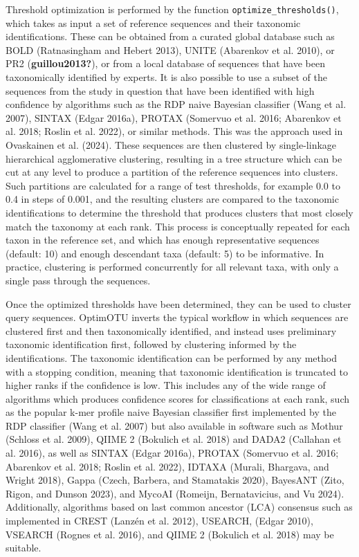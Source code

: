 \documentclass[
]{article}
\begin{document}
Threshold optimization is performed by the function \texttt{optimize\_thresholds()}, which takes as input a set of reference sequences and their taxonomic identifications.
These can be obtained from a curated global database such as BOLD (Ratnasingham and Hebert 2013), UNITE (Abarenkov et al. 2010), or PR2 (\textbf{guillou2013?}), or from a local database of sequences that have been taxonomically identified by experts.
It is also possible to use a subset of the sequences from the study in question that have been identified with high confidence by algorithms such as the RDP naive Bayesian classifier (Wang et al. 2007), SINTAX (Edgar 2016a), PROTAX (Somervuo et al. 2016; Abarenkov et al. 2018; Roslin et al. 2022), or similar methods.
This was the approach used in Ovaskainen et al. (2024).
These sequences are then clustered by single-linkage hierarchical agglomerative clustering, resulting in a tree structure which can be cut at any level to produce a partition of the reference sequences into clusters.
Such partitions are calculated for a range of test thresholds, for example 0.0 to 0.4 in steps of 0.001, and the resulting clusters are compared to the taxonomic identifications to determine the threshold that produces clusters that most closely match the taxonomy at each rank.
This process is conceptually repeated for each taxon in the reference set, and which has enough representative sequences (default: 10) and enough descendant taxa (default: 5) to be informative.
In practice, clustering is performed concurrently for all relevant taxa, with only a single pass through the sequences.

Once the optimized thresholds have been determined, they can be used to cluster query sequences.
OptimOTU inverts the typical workflow in which sequences are clustered first and then taxonomically identified, and instead uses preliminary taxonomic identification first, followed by clustering informed by the identifications.
The taxonomic identification can be performed by any method with a stopping condition, meaning that taxonomic identification is truncated to higher ranks if the confidence is low.
This includes any of the wide range of algorithms which produces confidence scores for classifications at each rank, such as the popular k-mer profile naive Bayesian classifier first implemented by the RDP classifier (Wang et al. 2007) but also available in software such as Mothur (Schloss et al. 2009), QIIME 2 (Bokulich et al. 2018) and DADA2 (Callahan et al. 2016), as well as SINTAX (Edgar 2016a), PROTAX (Somervuo et al. 2016; Abarenkov et al. 2018; Roslin et al. 2022), IDTAXA (Murali, Bhargava, and Wright 2018), Gappa (Czech, Barbera, and Stamatakis 2020), BayesANT (Zito, Rigon, and Dunson 2023), and MycoAI (Romeijn, Bernatavicius, and Vu 2024).
Additionally, algorithms based on last common ancestor (LCA) consensus such as implemented in CREST (Lanzén et al. 2012), USEARCH, (Edgar 2010), VSEARCH (Rognes et al. 2016), and QIIME 2 (Bokulich et al. 2018) may be suitable.
\end{document}
